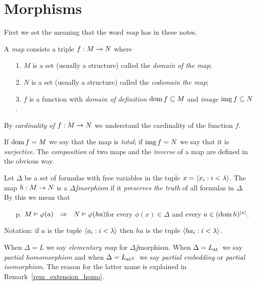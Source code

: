 \documentclass[creche.tex]{subfiles}
\begin{document}
\section{Morphisms}
\label{morphisms}

\def\ceq#1#2#3{\parbox[b]{15ex}{$\displaystyle #1$}\parbox[b]{6ex}{\hfil$#2$}$\displaystyle #3$}

First we set the meaning that the word \emph{map\/} has in these notes.

\begin{definition}\label{defmappa}
A \emph{map\/} consists a triple $f:M\rightarrow N$ where
\begin{itemize}
\item[1.] $M$ is a set (usually a structure) called the \emph{domain of the map};
\item[2.] $N$ is a set (usually a structure) called the \emph{codomain the map};
\item[3.] $f$ is a function with \emph{domain of definition\/} $\mathop{\rm dom} f\subseteq M$ and \emph{image} $\mathop{\rm img} f\subseteq N$.
\end{itemize}
By \emph{cardinality of $f:M\rightarrow N$\/} we understand the cardinality of the function $f$.\QED
\end{definition}

If $\mathop{\rm dom} f = M$ we say that the map is \emph{total}; if $\mathop{\rm img} f=N$ we say that it is \emph{surjective\/}. The \emph{composition\/} of two maps and the \emph{inverse\/} of a map are defined in the obvious way.

\begin{definition}\label{defpreservaveritas}
Let $\Delta$ be a set of formulas with free variables in the tuple $x=\langle x_i: i<\lambda\rangle$. The map $h:M\rightarrow N$ is a \emph{$\Delta\jj$morphism\/} if it  \emph{preserves the truth\/} of all formulas in $\Delta$. By this we mean that
\begin{itemize}
\item[p.] $M\models\phi(a)\ \ \IMP\ \ N\models\phi(ha)$\hfill for every $\phi(x)\in\Delta$ and every $a\in(\mathop{\rm dom} h)^{|x|}$.
\end{itemize}
Notation: if $a$ is the tuple $\langle a_i: i<\lambda\rangle$ then $ha$ is the tuple $\langle ha_i: i<\lambda\rangle$.\QED
\end{definition}

When $\Delta=L$ we say \emph{elementary map\/} for $\Delta\jj$morphism. When  $\Delta=L_{\tiny\rm at}\hskip-.3ex\ $ we say  \emph{partial homomorphism\/} and when $\Delta=\atpmL\ $ we say \emph{partial embedding\/} or \emph{partial isomorphism}. The reason for the latter name is explained in Remark~\ref{rem_extension_homo}.
\end{document}
